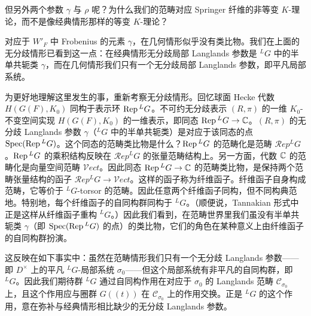 但另外两个参数 $\gamma$ 与 $\rho$ 呢？为什么我们的范畴对应 Springer 纤维的非等变 $K$-理论，而不是像经典情形那样的等变 $K$-理论？

对应于 $W'_F$ 中 Frobenius 的元素 $\gamma$，在几何情形似乎没有类比物。我们在上面的无分歧情形已看到这一点：在经典情形无分歧局部 Langlands 参数是 ${}^L G$ 中的半单共轭类 $\gamma$，而在几何情形我们只有一个无分歧局部 Langlands 参数，即平凡局部系统。

为更好地理解这里发生的事，重新考察无分歧情形。回忆球面 Hecke 代数 $H(G(F),K_0)$ 同构于表示环 $\operatorname{Rep}{}^L G$。不可约无分歧表示 $(R,\pi)$ 的一维 $K_0$-不变空间实现 $H(G(F),K_0)$ 的一维表示，即同态 $\operatorname{Rep}{}^L G\to\mathbb{C}$。$(R,\pi)$ 的无分歧 Langlands 参数 $\gamma$（${}^L G$ 中的半单共轭类）是对应于该同态的点 $\operatorname{Spec}(\operatorname{Rep}{}^L G)$。这个同态的范畴类比物是什么？$\operatorname{Rep}{}^L G$ 的范畴化是范畴 $\mathcal{R}ep{}^L G$。$\operatorname{Rep}{}^L G$ 的乘积结构反映在 $\mathcal{R}ep{}^L G$ 的张量范畴结构上。另一方面，代数 $\mathbb{C}$ 的范畴化是向量空间范畴 $\mathcal{V}ect$。因此同态 $\operatorname{Rep}{}^L G\to\mathbb{C}$ 的范畴类比物，是保持两个范畴张量结构的函子 $\mathcal{R}ep{}^L G\to\mathcal{V}ect$。这样的函子称为纤维函子。纤维函子自身构成范畴，它等价于 ${}^L G$-torsor 的范畴。因此任意两个纤维函子同构，但不同构典范地。特别地，每个纤维函子的自同构群同构于 ${}^L G$。（顺便说，Tannakian 形式中正是这样从纤维函子重构 ${}^L G$。）因此我们看到，在范畴世界里我们虽没有半单共轭类 $\gamma$（即 $\operatorname{Spec}(\operatorname{Rep}{}^L G)$ 的点）的类比物，它们的角色在某种意义上由纤维函子的自同构群扮演。

这反映在如下事实中：虽然在范畴情形我们只有一个无分歧 Langlands 参数——即 $D^\times$ 上的平凡 ${}^L G$-局部系统 $\sigma_0$——但这个局部系统有非平凡的自同构群，即 ${}^L G$。因此我们期待群 ${}^L G$ 通过自同构作用在对应于 $\sigma_0$ 的 Langlands 范畴 $\mathcal{C}_{\sigma_0}$ 上，且这个作用应与圈群 $G((t))$ 在 $\mathcal{C}_{\sigma_0}$ 上的作用交换。正是 ${}^L G$ 的这个作用，意在弥补与经典情形相比缺少的无分歧 Langlands 参数。

